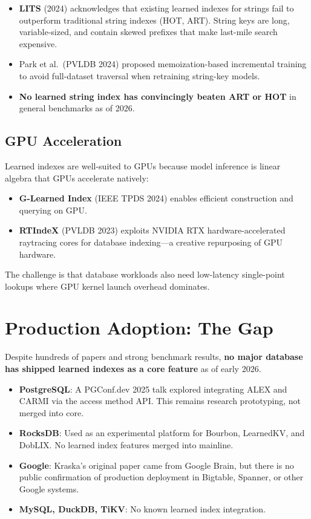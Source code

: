 \documentclass[11pt, a4paper]{article}
\begin{document}
\begin{itemize}[nosep]
    \item \textbf{LITS} (2024) acknowledges that existing learned indexes
        for strings fail to outperform traditional string indexes (HOT, ART).
        String keys are long, variable-sized, and contain skewed prefixes
        that make last-mile search expensive.
    \item Park et al.\ (PVLDB 2024) proposed memoization-based incremental
        training to avoid full-dataset traversal when retraining string-key models.
    \item \textbf{No learned string index has convincingly beaten ART or HOT}
        in general benchmarks as of 2026.
\end{itemize}

\subsection{GPU Acceleration}

Learned indexes are well-suited to GPUs because model inference is
linear algebra that GPUs accelerate natively:

\begin{itemize}[nosep]
    \item \textbf{G-Learned Index} (IEEE TPDS 2024) enables efficient
        construction and querying on GPU.
    \item \textbf{RTIndeX} (PVLDB 2023) exploits NVIDIA RTX hardware-accelerated
        raytracing cores for database indexing---a creative repurposing of
        GPU hardware.
\end{itemize}

The challenge is that database workloads also need low-latency single-point
lookups where GPU kernel launch overhead dominates.

\section{Production Adoption: The Gap}

Despite hundreds of papers and strong benchmark results, \textbf{no major
database has shipped learned indexes as a core feature} as of early 2026.

\begin{itemize}[nosep]
    \item \textbf{PostgreSQL}: A PGConf.dev 2025 talk explored integrating
        ALEX and CARMI via the access method API. This remains research
        prototyping, not merged into core.
    \item \textbf{RocksDB}: Used as an experimental platform for Bourbon,
        LearnedKV, and DobLIX. No learned index features merged into mainline.
    \item \textbf{Google}: Kraska's original paper came from Google Brain,
        but there is no public confirmation of production deployment in
        Bigtable, Spanner, or other Google systems.
    \item \textbf{MySQL, DuckDB, TiKV}: No known learned index integration.
\end{itemize}
\end{document}
